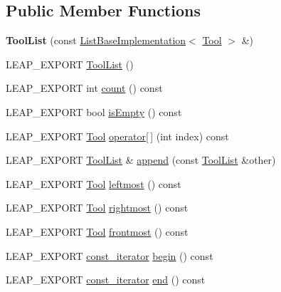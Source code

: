 \subsection*{Public Member Functions}
\begin{DoxyCompactItemize}
\item 
\mbox{\label{class_leap_1_1_tool_list_a28459f829ceca1ac6edfe5dd5f0a73d5}} 
{\bfseries Tool\+List} (const \hyperlink{class_leap_1_1_list_base_implementation}{List\+Base\+Implementation}$<$ \hyperlink{class_leap_1_1_tool}{Tool} $>$ \&)
\item 
L\+E\+A\+P\+\_\+\+E\+X\+P\+O\+RT \hyperlink{class_leap_1_1_tool_list_a3ee8e7e7b50f92b9d31ad31e7fd55c2e}{Tool\+List} ()
\item 
L\+E\+A\+P\+\_\+\+E\+X\+P\+O\+RT int \hyperlink{class_leap_1_1_tool_list_a3c00cbcc8e1eab50c0767923a85590b7}{count} () const
\item 
L\+E\+A\+P\+\_\+\+E\+X\+P\+O\+RT bool \hyperlink{class_leap_1_1_tool_list_a2db50cd3944d2f6af53bb4c492c6ef91}{is\+Empty} () const
\item 
L\+E\+A\+P\+\_\+\+E\+X\+P\+O\+RT \hyperlink{class_leap_1_1_tool}{Tool} \hyperlink{class_leap_1_1_tool_list_ae8b61cd22cda8f80155bddd5b9ba7d43}{operator\mbox{[}$\,$\mbox{]}} (int index) const
\item 
L\+E\+A\+P\+\_\+\+E\+X\+P\+O\+RT \hyperlink{class_leap_1_1_tool_list}{Tool\+List} \& \hyperlink{class_leap_1_1_tool_list_a384adf507eeb1cfacc5aaa71a38ca452}{append} (const \hyperlink{class_leap_1_1_tool_list}{Tool\+List} \&other)
\item 
L\+E\+A\+P\+\_\+\+E\+X\+P\+O\+RT \hyperlink{class_leap_1_1_tool}{Tool} \hyperlink{class_leap_1_1_tool_list_a257dd0d735fe8f646bb5e38807cdb17b}{leftmost} () const
\item 
L\+E\+A\+P\+\_\+\+E\+X\+P\+O\+RT \hyperlink{class_leap_1_1_tool}{Tool} \hyperlink{class_leap_1_1_tool_list_a7f1a5e3b06985e0760c24b50d8451ae5}{rightmost} () const
\item 
L\+E\+A\+P\+\_\+\+E\+X\+P\+O\+RT \hyperlink{class_leap_1_1_tool}{Tool} \hyperlink{class_leap_1_1_tool_list_a906b0ad79923a20d009a021e03345e4f}{frontmost} () const
\item 
L\+E\+A\+P\+\_\+\+E\+X\+P\+O\+RT \hyperlink{class_leap_1_1_tool_list_a7f52ee5561016e8d42512e2adbc820de}{const\+\_\+iterator} \hyperlink{class_leap_1_1_tool_list_aed5c9b6918f7fd1d85c1e8f0b58ad7fb}{begin} () const
\item 
L\+E\+A\+P\+\_\+\+E\+X\+P\+O\+RT \hyperlink{class_leap_1_1_tool_list_a7f52ee5561016e8d42512e2adbc820de}{const\+\_\+iterator} \hyperlink{class_leap_1_1_tool_list_a9fa89f22ffa05f98216f3f0d8c95cbc7}{end} () const
\end{DoxyCompactItemize}

